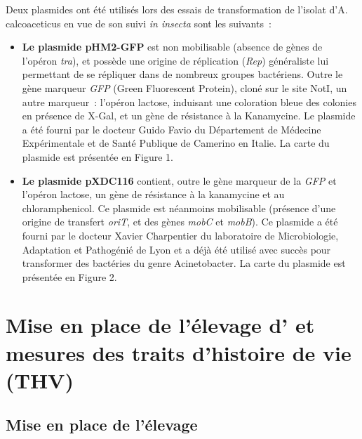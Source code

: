 Deux plasmides ont été utilisés lors des essais de transformation de l’isolat d’A. calcoaceticus en vue de son suivi \textit{in insecta} sont les suivants~:
\begin{itemize}
\item \textbf{Le plasmide pHM2-GFP} est non mobilisable (absence de gènes de l'opéron \textit{tra}), et possède une origine de réplication (\textit{Rep}) généraliste lui permettant de se répliquer dans de nombreux groupes bactériens.
Outre le gène marqueur \textit{GFP} (Green Fluorescent Protein), cloné sur le site NotI, un autre marqueur~: l'opéron lactose, induisant une coloration bleue des colonies en présence de X-Gal, et un gène de résistance à la Kanamycine.
Le plasmide a été fourni par le docteur Guido Favio du Département de Médecine Expérimentale et de Santé Publique de Camerino en Italie. La carte du plasmide est présentée en Figure 1.\cite{favia2007}

\item \textbf{Le plasmide pXDC116} contient, outre le gène marqueur de la \textit{GFP} et l'opéron lactose, un gène de résistance à la kanamycine et au chloramphenicol. Ce plasmide est néanmoins mobilisable (présence d'une origine de transfert \textit{oriT}, et des gènes \textit{mobC} et \textit{mobB}).
Ce plasmide a été fourni par le docteur Xavier Charpentier du laboratoire de Microbiologie, Adaptation et Pathogénié de Lyon et a déjà été utilisé avec succès pour transformer des bactéries du genre Acinetobacter. La carte du plasmide est présentée en Figure 2.

\end{itemize}


\section{Mise en place de l'élevage d' et mesures des traits d'histoire de vie (THV)}

\subsection{Mise en place de l'élevage}

